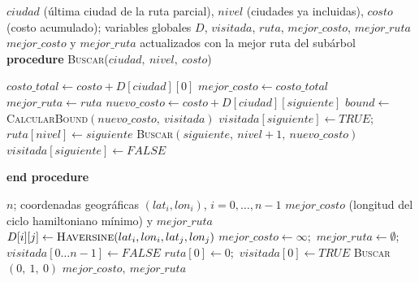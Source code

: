 \documentclass[12pt,a4paper]{article}
\makeatletter
\newcommand{\PROCEDURE}[2]{\STATE \textbf{procedure} \textsc{#1}(#2)\begin{ALC@g}}
\newcommand{\ENDPROCEDURE}{\end{ALC@g}\STATE \textbf{end procedure}}
\makeatother
\begin{document}
\begin{algorithm}[H]
\caption{\textsc{Buscar}: exploración secuencial del árbol (Branch and Bound)}
\label{alg:buscar_sec}
\begin{algorithmic}[1]
    \REQUIRE $ciudad$ (última ciudad de la ruta parcial), $nivel$ (ciudades ya incluidas), $costo$ (costo acumulado); variables globales $D$, $visitada$, $ruta$, $mejor\_costo$, $mejor\_ruta$
    \ENSURE $mejor\_costo$ y $mejor\_ruta$ actualizados con la mejor ruta del subárbol
    \PROCEDURE{Buscar}{$ciudad,\ nivel,\ costo$}
            \STATE $costo\_total \gets costo + D[ciudad][0]$ 
                \STATE $mejor\_costo \gets costo\_total$ 
                \STATE $mejor\_ruta \gets ruta$ 
            \ENDIF
            \RETURN
        \ENDIF
                \STATE $nuevo\_costo \gets costo + D[ciudad][siguiente]$ 
                \STATE $bound \gets$ \textsc{CalcularBound}$(nuevo\_costo,\ visitada)$ 
                    \STATE $visitada[siguiente] \gets TRUE$;\ $ruta[nivel] \gets siguiente$ 
                    \STATE \textsc{Buscar}$(siguiente,\ nivel+1,\ nuevo\_costo)$ 
                    \STATE $visitada[siguiente] \gets FALSE$ 
                \ENDIF
            \ENDIF
        \ENDFOR
    \ENDPROCEDURE
\end{algorithmic}
\end{algorithm}

\begin{algorithm}[H]
\caption{\textsc{Main} secuencial}
\label{alg:main_sec}
\begin{algorithmic}[1]
    \REQUIRE $n$; coordenadas geográficas $(lat_i, lon_i)$, $i = 0,\dots,n-1$
    \ENSURE $mejor\_costo$ (longitud del ciclo hamiltoniano mínimo) y $mejor\_ruta$
            \STATE $D[i][j] \gets \textsc{Haversine}(lat_i, lon_i, lat_j, lon_j)$ 
        \ENDFOR
    \ENDFOR
    \STATE $mejor\_costo \gets \infty$;\ $mejor\_ruta \gets \emptyset$;\ $visitada[0\dots n-1] \gets FALSE$ 
    \STATE $ruta[0] \gets 0$;\ $visitada[0] \gets TRUE$ 
    \STATE \textsc{Buscar}$(0,\ 1,\ 0)$ 
    \RETURN $mejor\_costo,\ mejor\_ruta$
\end{algorithmic}
\end{algorithm}
\end{document}
